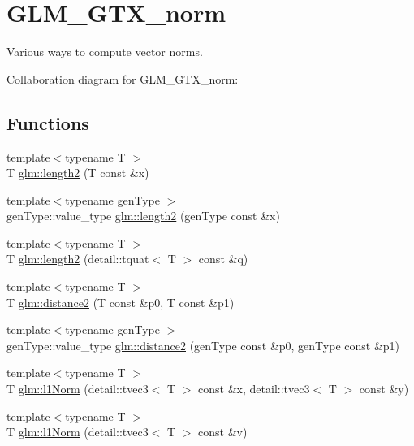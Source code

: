 \hypertarget{group__gtx__norm}{}\section{G\+L\+M\+\_\+\+G\+T\+X\+\_\+norm}
\label{group__gtx__norm}


Various ways to compute vector norms.  


Collaboration diagram for G\+L\+M\+\_\+\+G\+T\+X\+\_\+norm\+:
\subsection*{Functions}
\begin{DoxyCompactItemize}
\item 
{\footnotesize template$<$typename T $>$ }\\T \hyperlink{group__gtx__norm_ga1d8568485d8bbe6593dbbc2221659dfe}{glm\+::length2} (T const \&x)
\item 
{\footnotesize template$<$typename gen\+Type $>$ }\\gen\+Type\+::value\+\_\+type \hyperlink{group__gtx__norm_ga2e489e9efce12a44b753548c15b59c06}{glm\+::length2} (gen\+Type const \&x)
\item 
{\footnotesize template$<$typename T $>$ }\\T \hyperlink{group__gtx__norm_ga2d9882f01bf0def991047f712dede6ba}{glm\+::length2} (detail\+::tquat$<$ T $>$ const \&q)
\item 
{\footnotesize template$<$typename T $>$ }\\T \hyperlink{group__gtx__norm_ga9affa2e0e963514b276b54b778986145}{glm\+::distance2} (T const \&p0, T const \&p1)
\item 
{\footnotesize template$<$typename gen\+Type $>$ }\\gen\+Type\+::value\+\_\+type \hyperlink{group__gtx__norm_gafc6f577012065509f8fc332656ad81f0}{glm\+::distance2} (gen\+Type const \&p0, gen\+Type const \&p1)
\item 
{\footnotesize template$<$typename T $>$ }\\T \hyperlink{group__gtx__norm_ga8783c302b3fc787dbdb120d77c01ca1a}{glm\+::l1\+Norm} (detail\+::tvec3$<$ T $>$ const \&x, detail\+::tvec3$<$ T $>$ const \&y)
\item 
{\footnotesize template$<$typename T $>$ }\\T \hyperlink{group__gtx__norm_ga44ba61367ab9578787afad618f517e1d}{glm\+::l1\+Norm} (detail\+::tvec3$<$ T $>$ const \&v)

\end{DoxyCompactItemize}

